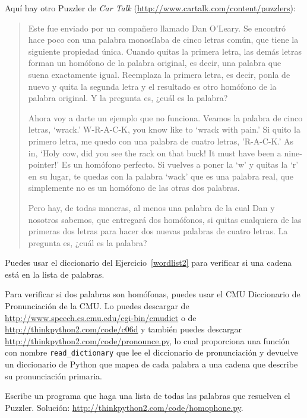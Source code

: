 \documentclass[10pt]{book}
\begin{document}
\begin{exercise}

Aquí hay otro Puzzler de {\em Car Talk}
(\url{http://www.cartalk.com/content/puzzlers}):

\begin{quote}
Este fue enviado por un compañero llamado Dan O'Leary. Se encontró hace poco con una palabra
monosílaba de cinco letras común, que tiene la siguiente propiedad
única. Cuando quitas la primera letra, las demás letras forman
un homófono de la palabra original, es decir, una palabra que suena exactamente
igual. Reemplaza la primera letra, es decir, ponla de nuevo y quita
la segunda letra y el resultado es otro homófono de la
palabra original. Y la pregunta es, ¿cuál es la palabra?

Ahora voy a darte un ejemplo que no funciona. Veamos la palabra
de cinco letras, `wrack.' W-R-A-C-K, you know like to `wrack with
pain.' Si quito la primero letra, me quedo con una palabra de cuatro
letras, 'R-A-C-K.' As in, `Holy cow, did you see the rack on that buck!
It must have been a nine-pointer!' Es un homófono perfecto. Si
vuelves a poner la `w' y quitas la `r' en su lugar, te quedas con la
palabra `wack' que es una palabra real, que simplemente no es un homófono de las
otras dos palabras.

Pero hay, de todas maneras, al menos una palabra de la cual Dan y nosotros sabemos,
que entregará dos homófonos, si quitas cualquiera de las primeras dos
letras para hacer dos nuevas palabras de cuatro letras. La pregunta es, ¿cuál
es la palabra?
\end{quote}

Puedes usar el diccionario del Ejercicio~\ref{wordlist2} para verificar
si una cadena está en la lista de palabras.

Para verificar si dos palabras son homófonas, puedes usar el CMU
Diccionario de Pronunciación de la CMU.  Lo puedes descargar de
\url{http://www.speech.cs.cmu.edu/cgi-bin/cmudict} o de
\url{http://thinkpython2.com/code/c06d} y también puedes descargar
\url{http://thinkpython2.com/code/pronounce.py}, lo cual proporciona una función
con nombre \verb"read_dictionary" que lee el diccionario de pronunciación y
devuelve un diccionario de Python que mapea de cada palabra a una cadena que 
describe su pronunciación primaria.

Escribe un programa que haga una lista de todas las palabras que resuelven el Puzzler.
Solución: \url{http://thinkpython2.com/code/homophone.py}.

\end{exercise}
\end{document}
